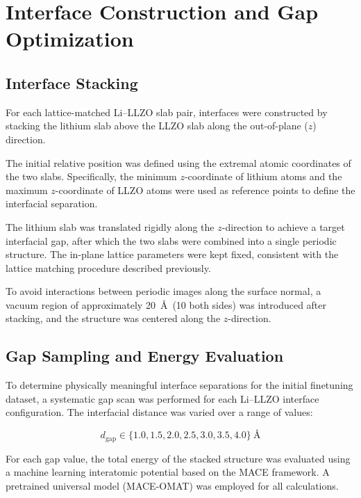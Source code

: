 \documentclass[12pt,a4paper,oneside]{book}
\begin{document}
\section{Interface Construction and Gap Optimization}

\subsection{Interface Stacking}
\label{sec:interface_stacking}

For each lattice-matched Li--LLZO slab pair, interfaces were constructed by
stacking the lithium slab above the LLZO slab along the out-of-plane ($z$) direction.

The initial relative position was defined using the extremal atomic coordinates
of the two slabs. Specifically, the minimum $z$-coordinate of lithium atoms and
the maximum $z$-coordinate of LLZO atoms were used as reference points to define
the interfacial separation.

The lithium slab was translated rigidly along the $z$-direction to achieve a
target interfacial gap, after which the two slabs were combined into a single
periodic structure. The in-plane lattice parameters were kept fixed, consistent
with the lattice matching procedure described previously.

To avoid interactions between periodic images along the surface normal, a vacuum
region of approximately 20~\AA\ (10 both sides) was introduced after stacking, and the structure
was centered along the $z$-direction.

\subsection{Gap Sampling and Energy Evaluation}

To determine physically meaningful interface separations for the initial 
finetuning dataset, a systematic gap scan was performed for each Li--LLZO interface configuration. The interfacial distance
was varied over a range of values:

\begin{equation}
d_{\mathrm{gap}} \in \{1.0, 1.5, 2.0, 2.5, 3.0, 3.5, 4.0\}~\text{\AA}
\end{equation}

For each gap value, the total energy of the stacked structure was evaluated using
a machine learning interatomic potential based on the MACE framework. A pretrained
universal model (MACE-OMAT) was employed for all calculations.
\end{document}
